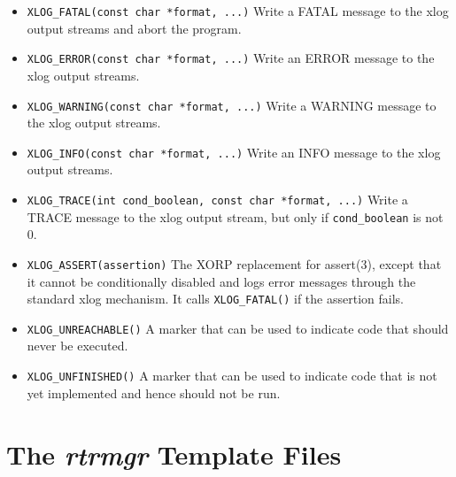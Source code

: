 \documentclass[11pt]{article}
\begin{document}
\begin{itemize}

  \item \verb=XLOG_FATAL(const char *format, ...)=
  \newline
  Write a FATAL message to the xlog output streams and abort the program.

  \item \verb=XLOG_ERROR(const char *format, ...)=
  \newline
  Write an ERROR message to the xlog output streams.

  \item \verb=XLOG_WARNING(const char *format, ...)=
  \newline
  Write a WARNING message to the xlog output streams.

  \item \verb=XLOG_INFO(const char *format, ...)=
  \newline
  Write an INFO message to the xlog output streams.

  \item \verb=XLOG_TRACE(int cond_boolean, const char *format, ...)=
  \newline
  Write a TRACE message to the xlog output stream, but only
  if \verb=cond_boolean= is not 0.

  \item \verb=XLOG_ASSERT(assertion)=
  \newline
  The XORP replacement for assert(3), except that it cannot be
  conditionally disabled and logs error messages through the standard
  xlog mechanism. It calls \verb=XLOG_FATAL()= if the assertion fails.

  \item \verb=XLOG_UNREACHABLE()=
  \newline
  A marker that can be used to indicate code that should never be executed.

  \item \verb=XLOG_UNFINISHED()=
  \newline
  A marker that can be used to indicate code that is not yet implemented
  and hence should not be run.

\end{itemize}

\newpage

\section{The {\it rtrmgr} Template Files}
\label{rtrmgr_templates}
\end{document}
